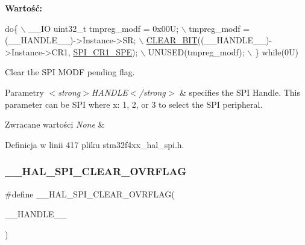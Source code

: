 {\bfseries Wartość\+:}
\begin{DoxyCode}
\textcolor{keywordflow}{do}\{                                                    \(\backslash\)
    \_\_IO uint32\_t tmpreg\_modf = 0x00U;                   \(\backslash\)
    tmpreg\_modf = (\_\_HANDLE\_\_)->Instance->SR;            \(\backslash\)
    \hyperlink{group___exported__macro_ga133aae6fc0d41bffab39ab223a7001de}{CLEAR\_BIT}((\_\_HANDLE\_\_)->Instance->CR1, \hyperlink{group___peripheral___registers___bits___definition_gac5a646d978d3b98eb7c6a5d95d75c3f9}{SPI\_CR1\_SPE}); \(\backslash\)
    UNUSED(tmpreg\_modf);                                 \(\backslash\)
  \} \textcolor{keywordflow}{while}(0U)
\end{DoxyCode}


Clear the S\+PI M\+O\+DF pending flag. 


\begin{DoxyParams}{Parametry}
{\em $<$strong$>$\+H\+A\+N\+D\+L\+E$<$/strong$>$} & specifies the S\+PI Handle. This parameter can be S\+PI where x\+: 1, 2, or 3 to select the S\+PI peripheral. \\
\hline
\end{DoxyParams}

\begin{DoxyRetVals}{Zwracane wartości}
{\em None} & \\
\hline
\end{DoxyRetVals}


Definicja w linii 417 pliku stm32f4xx\+\_\+hal\+\_\+spi.\+h.

\mbox{\label{group___s_p_i___exported___macros_gaf6af33b1c5d334b9fe7bb778c5b6442e}} 
\subsubsection{\texorpdfstring{\+\_\+\+\_\+\+H\+A\+L\+\_\+\+S\+P\+I\+\_\+\+C\+L\+E\+A\+R\+\_\+\+O\+V\+R\+F\+L\+AG}{\_\_HAL\_SPI\_CLEAR\_OVRFLAG}}
{\footnotesize\ttfamily \#define \+\_\+\+\_\+\+H\+A\+L\+\_\+\+S\+P\+I\+\_\+\+C\+L\+E\+A\+R\+\_\+\+O\+V\+R\+F\+L\+AG(\begin{DoxyParamCaption}\item[{}]{\+\_\+\+\_\+\+H\+A\+N\+D\+L\+E\+\_\+\+\_\+ }\end{DoxyParamCaption})}

